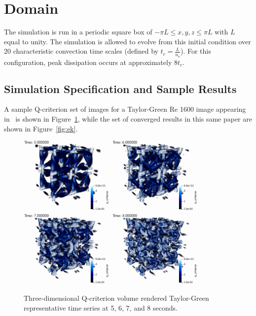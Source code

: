 \documentclass{article}
\begin{document}
\section{Domain}
The simulation is run in a periodic square box of $-\pi L \leq x,y,z \leq \pi L$ with $L$ equal to unity. The simulation
is allowed to evolve from this initial condition over 20 characteristic convection time scales (defined 
by $t_c = \frac{L}{u_o}$). For this configuration, peak dissipation occurs at approximately $8t_c$.

\subsection{Simulation Specification and Sample Results}
A sample Q-criterion set of images for a Taylor-Green Re 1600 image appearing in~\cite{domino2019} is shown in 
Figure~\ref{fig:q}, while the set of converged results in this same paper are shown in Figure~\ref{fig:ek}.

\begin{figure}[!htbp]
  \centering
  {
   \includegraphics[height=1.5in]{images/tg_5s.png}
  }
  {
   \includegraphics[height=1.5in]{images/tg_6s.png}
  } \\
  {
   \includegraphics[height=1.5in]{images/tg_7s.png}
  }
  {
   \includegraphics[height=1.5in]{images/tg_8s.png}
  }
  \caption{Three-dimensional Q-criterion volume rendered Taylor-Green representative time series at 5, 6, 7, and 8 seconds.}
  \label{fig:q}
\end{figure}
\end{document}
